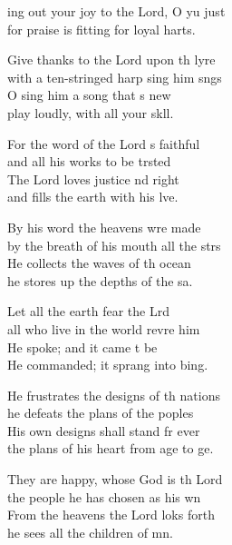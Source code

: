 \settowidth{\versewidth}{Ring out your joy to the Lord, O you just}
\begin{psalmverse}%
  \begin{patverse}
    ing out your joy to the Lord, O yu just\\
    for praise is fitting for loyal harts.

Give thanks to the Lord upon th lyre\\
    with a ten-stringed harp sing him sngs\\
O sing him a song that \pointup{\i}s new\\
    play loudly, with all your sk\pointup{\i}ll.

For the word of the Lord \pointup{\i}s faithful\\
    and all his works to be trsted\\
The Lord loves justice nd right\\
    and fills the earth with his lve.

By his word the heavens wre made\\
    by the breath of his mouth all the strs\\
He collects the waves of th ocean\\
    he stores up the depths of the sa.

Let all the earth fear the Lrd\\
    all who live in the world revre him\\
He spoke; and it came t be\\
    He commanded; it sprang into bing.

He frustrates the designs of th nations\\
    he defeats the plans of the poples\\
His own designs shall stand fr ever\\
    the plans of his heart from age to ge.

They are happy, whose God is th Lord\\
    the people he has chosen as his wn\\
From the heavens the Lord loks forth\\
    he sees all the children of mn.


\end{patverse}
\end{psalmverse}
